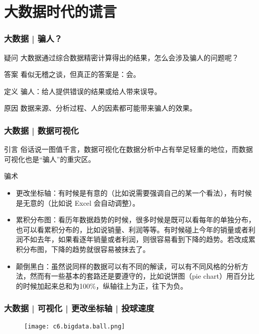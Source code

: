\section{大数据时代的谎言}
\begin{frame}
  \frametitle{大数据 | 骗人？}
  \begin{block}{疑问}
    大数据通过综合数据精密计算得出的结果，怎么会涉及骗人的问题呢？
  \end{block}
  \pause
  \begin{block}{答案}
    看似无稽之谈，但真正的答案是：\alert{会}。
  \end{block}
  \pause
  \begin{block}{定义}
    骗人：给人提供错误的结果或给人带来误导。
  \end{block}
  \pause
  \begin{block}{原因}
    数据来源、分析过程、人的因素都可能带来骗人的效果。
  \end{block}
\end{frame}

\begin{frame}
  \frametitle{大数据 | 数据可视化}
  \begin{block}{引言}
    俗话说一图值千言，数据可视化在数据分析中占有举足轻重的地位，而数据可视化也是“骗人”的重灾区。
  \end{block}
  \vspace{-0.5em}
  \pause
  \begin{block}{骗术}
    \begin{itemize}
      \item 更改坐标轴：有时候是有意的（比如说需要强调自己的某一个看法），有时候是无意的（比如说 Excel 会自动调整）。
      \item 累积分布图：看历年数据趋势的时候，很多时候是既可以看每年的单独分布，也可以看累积分布的，比如说销量、利润等等。有时候碰上今年的销量或者利润不如去年，如果看逐年销量或者利润，则很容易看到下降的趋势。若改成累积分布图，下降的趋势就很容易被抹去了。
      \item 颠倒黑白：虽然说同样的数据可以有不同的解读，可以有不同风格的分析方法，然而有一些基本的套路还是要遵守的，比如说饼图（pie chart）用百分比的时候加起来总和为100\%，纵轴往上为正，往下为负。
    \end{itemize}
  \end{block}
\end{frame}

\begin{frame}
  \frametitle{大数据 | 可视化 | 更改坐标轴 | 投球速度}
  \begin{figure}
    \centering
    \texttt{[image: c6.bigdata.ball.png]}
  \end{figure}
\end{frame}

